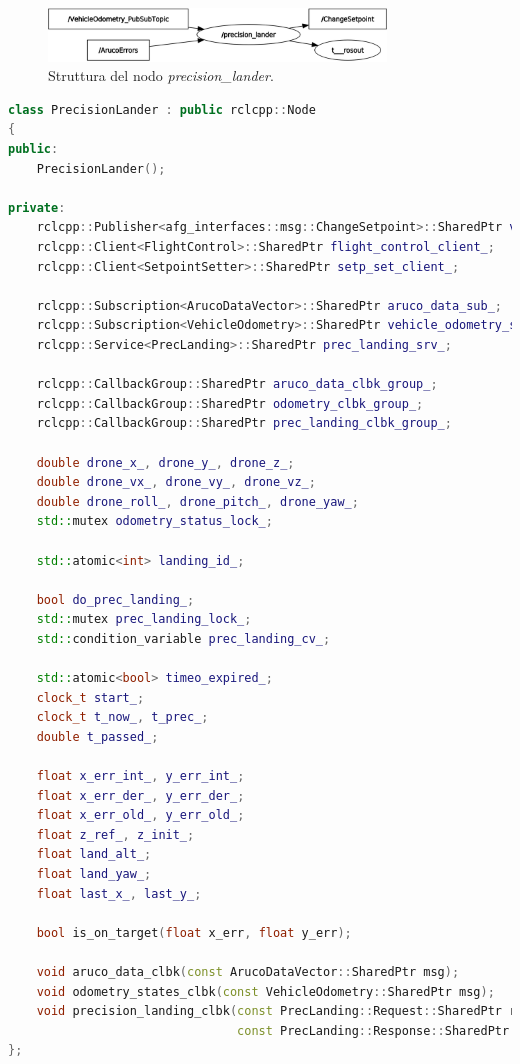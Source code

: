 \begin{figure}
    \centering
    \includegraphics[width=0.8\textwidth]{figs/chapter3/pland.png}
    \caption{Struttura del nodo \emph{precision\_lander}.}
    \label{fig:pland}
\end{figure}
\vspace{0.5cm}
\begin{lstlisting}[language=C++, caption={Definizione del nodo \emph{precision\_lander}.}, label={lst:pland}]
class PrecisionLander : public rclcpp::Node
{
public:
    PrecisionLander();

private:
    rclcpp::Publisher<afg_interfaces::msg::ChangeSetpoint>::SharedPtr vel_setp_pub_;
    rclcpp::Client<FlightControl>::SharedPtr flight_control_client_;
    rclcpp::Client<SetpointSetter>::SharedPtr setp_set_client_;

    rclcpp::Subscription<ArucoDataVector>::SharedPtr aruco_data_sub_;
    rclcpp::Subscription<VehicleOdometry>::SharedPtr vehicle_odometry_sub_;
    rclcpp::Service<PrecLanding>::SharedPtr prec_landing_srv_;

    rclcpp::CallbackGroup::SharedPtr aruco_data_clbk_group_;
    rclcpp::CallbackGroup::SharedPtr odometry_clbk_group_;
    rclcpp::CallbackGroup::SharedPtr prec_landing_clbk_group_;

    double drone_x_, drone_y_, drone_z_;
    double drone_vx_, drone_vy_, drone_vz_;
    double drone_roll_, drone_pitch_, drone_yaw_;
    std::mutex odometry_status_lock_;

    std::atomic<int> landing_id_;

    bool do_prec_landing_;
    std::mutex prec_landing_lock_;
    std::condition_variable prec_landing_cv_;

    std::atomic<bool> timeo_expired_;
    clock_t start_;
    clock_t t_now_, t_prec_;
    double t_passed_;

    float x_err_int_, y_err_int_;
    float x_err_der_, y_err_der_;
    float x_err_old_, y_err_old_;
    float z_ref_, z_init_;
    float land_alt_;
    float land_yaw_;
    float last_x_, last_y_;

    bool is_on_target(float x_err, float y_err);

    void aruco_data_clbk(const ArucoDataVector::SharedPtr msg);
    void odometry_states_clbk(const VehicleOdometry::SharedPtr msg);
    void precision_landing_clbk(const PrecLanding::Request::SharedPtr request,
                                const PrecLanding::Response::SharedPtr response);
};
\end{lstlisting}
